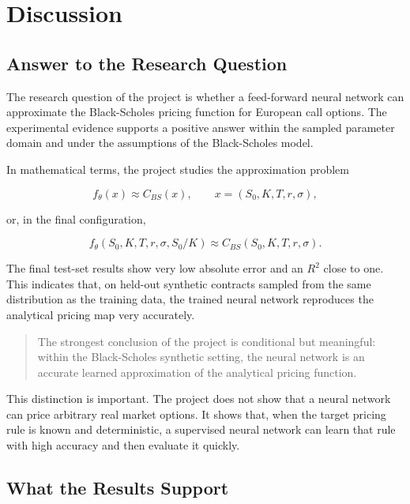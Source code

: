 \chapter{Discussion}

\section{Answer to the Research Question}

The research question of the project is whether a feed-forward neural network can approximate the Black-Scholes pricing function for European call options.
The experimental evidence supports a positive answer within the sampled parameter domain and under the assumptions of the Black-Scholes model.

In mathematical terms, the project studies the approximation problem

\begin{equation}
    f_\theta(x)
    \approx
    C_{BS}(x),
    \qquad
    x = (S_0, K, T, r, \sigma),
\end{equation}

or, in the final configuration,

\begin{equation}
    f_\theta(S_0, K, T, r, \sigma, S_0/K)
    \approx
    C_{BS}(S_0, K, T, r, \sigma).
\end{equation}

The final test-set results show very low absolute error and an $R^2$ close to one.
This indicates that, on held-out synthetic contracts sampled from the same distribution as the training data, the trained neural network reproduces the analytical pricing map very accurately.

\begin{quote}
    The strongest conclusion of the project is conditional but meaningful:
    within the Black-Scholes synthetic setting, the neural network is an accurate learned approximation of the analytical pricing function.
\end{quote}

This distinction is important.
The project does not show that a neural network can price arbitrary real market options.
It shows that, when the target pricing rule is known and deterministic, a supervised neural network can learn that rule with high accuracy and then evaluate it quickly.

\section{What the Results Support}

